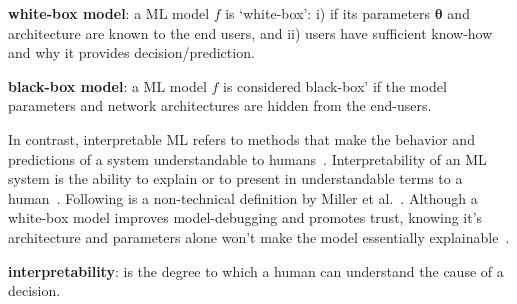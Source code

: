 \begin{definition}
    \textbf{white-box model}: a ML model $f$ is `white-box': i) if its parameters $\boldsymbol{\theta}$ and architecture are known to the end users, and ii) users have sufficient know-how and why it provides decision/prediction.  
\end{definition}

\begin{definition}
    \textbf{black-box model}: a ML model $f$ is considered black-box' if the model parameters and network architectures are hidden from the end-users. 
\end{definition}

\hspace*{3.5mm} In contrast, interpretable ML refers to methods that make the behavior and predictions of a system understandable to humans~\cite{molnar2019interpretable}. 
Interpretability of an ML system is the ability to explain or to present in understandable terms to a human~\cite{doshi2017towards}. Following is a non-technical definition by Miller et al.~\cite{XAI_miller}. Although a white-box model improves model-debugging and promotes trust, knowing it's architecture and parameters alone won't make the model essentially explainable~\cite{das2020opportunities}.  %

\begin{definition}
    \textbf{interpretability}: is the degree to which a human can understand the cause of a decision.
    \label{def:xai_1}
\end{definition}

